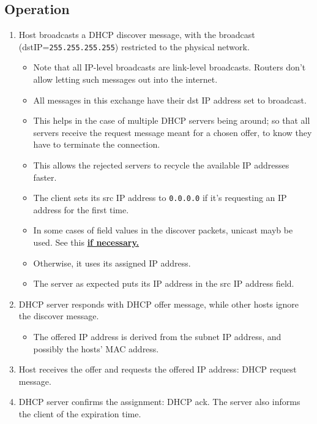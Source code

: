 \documentclass{report}
\begin{document}
\subsection{Operation}
\begin{enumerate}
\item Host broadcasts a DHCP discover message, with the broadcast (dstIP=\texttt{255.255.255.255}) restricted to the physical network.
\begin{itemize}
    \item Note that all IP-level broadcasts are link-level broadcasts. Routers don't allow letting such messages out into the internet.
    \item All messages in this exchange have their dst IP address set to broadcast.
    \item This helps in the case of multiple DHCP servers being around; so that all servers receive the request message meant for a chosen offer, to know they have to terminate the connection.
    \item This allows the rejected servers to recycle the available IP addresses faster.
    \item The client sets its src IP address to \texttt{0.0.0.0} if it's requesting an IP address for the first time.
    \item In some cases of field values in the discover packets, unicast mayb be used. See this \href{https://superuser.com/questions/1536810/why-are-dhcp-messages-broadcast}{\textbf{if necessary.}}
    \item Otherwise, it uses its assigned IP address.
    \item The server as expected puts its IP address in the src IP address field.
\end{itemize}
\item DHCP server responds with DHCP offer message, while other hosts ignore the discover message.
\begin{itemize}
    \item The offered IP address is derived from the subnet IP address, and possibly the hosts' MAC address.
\end{itemize}
\item Host receives the offer and requests the offered IP address: DHCP request message.
\item DHCP server confirms the assignment: DHCP ack. The server also informs the client of the expiration time.
\end{enumerate}
\end{document}
